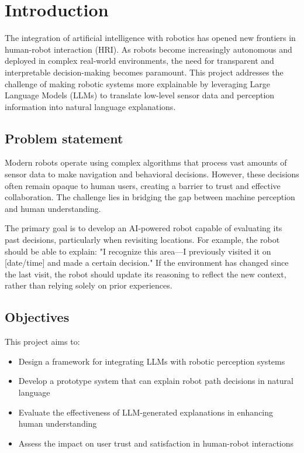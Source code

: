 \section{Introduction}

The integration of artificial intelligence with robotics has opened new frontiers in human-robot interaction (HRI). As robots become increasingly autonomous and deployed in complex real-world environments, the need for transparent and interpretable decision-making becomes paramount.
This project addresses the challenge of making robotic systems more explainable by leveraging Large Language Models (LLMs) to translate low-level sensor data and perception information into natural language explanations.

\subsection{Problem statement}

Modern robots operate using complex algorithms that process vast amounts of sensor data to make navigation and behavioral decisions.
However, these decisions often remain opaque to human users, creating a barrier to trust and effective collaboration.
The challenge lies in bridging the gap between machine perception and human understanding.

The primary goal is to develop an AI-powered robot capable of evaluating its past decisions, particularly when revisiting locations.
For example, the robot should be able to explain: "I recognize this area—I previously visited it on [date/time] and made a certain decision."
If the environment has changed since the last visit, the robot should update its reasoning to reflect the new context, rather than relying solely on prior experiences.

\subsection{Objectives}

This project aims to:
\begin{itemize}
    \item Design a framework for integrating LLMs with robotic perception systems
    \item Develop a prototype system that can explain robot path decisions in natural language
    \item Evaluate the effectiveness of LLM-generated explanations in enhancing human understanding
    \item Assess the impact on user trust and satisfaction in human-robot interactions
\end{itemize}
